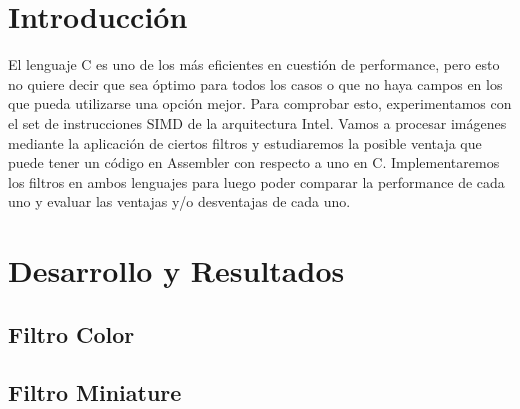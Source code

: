 \documentclass[a4paper,10pt,twoside]{article}
\begin{document}
\newpage




\tableofcontents

\newpage




\section{Introducción}

El lenguaje C es uno de los más eficientes en cuestión de performance, pero esto no quiere decir que sea óptimo para todos los casos o que no haya campos en los que pueda utilizarse una opción mejor.
Para comprobar esto, experimentamos con el set de instrucciones SIMD de la arquitectura Intel. Vamos a procesar imágenes mediante la aplicación de ciertos filtros y estudiaremos la posible ventaja que puede tener un código en Assembler con respecto a uno en C.
Implementaremos los filtros en ambos lenguajes para luego poder comparar la performance de cada uno y evaluar las ventajas y/o desventajas de cada uno.





\section{Desarrollo y Resultados}

\subsection{Filtro Color}



\subsection{Filtro Miniature}
\end{document}
